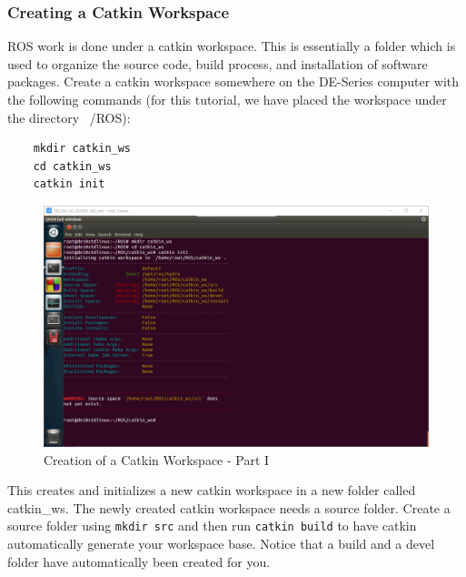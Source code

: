 \documentclass[11pt, twoside, pdftex]{article}
\begin{document}
\subsubsection{Creating a Catkin Workspace}
ROS work is done under a catkin workspace. This is essentially a folder which is used to organize the source code, build process, and installation of software packages. Create a catkin workspace somewhere on the DE-Series computer with the following commands (for this tutorial, we have placed the workspace under the directory ~/ROS):
\begin{lstlisting}
	mkdir catkin_ws
	cd catkin_ws
	catkin init
\end{lstlisting}
\begin{figure}[H]
	\begin{center}
		\includegraphics[scale=0.55]{figures/create_catkin_ws.png}
		\caption{Creation of a Catkin Workspace - Part I}
		\label{fig:createcatkinws}
	\end{center}
\end{figure}
\newpage
This creates and initializes a new catkin workspace in a new folder called {\sf catkin\_ws}. The newly created catkin workspace needs a source folder. Create a source folder using \lstinline|mkdir src| and then run \lstinline|catkin build| to have catkin automatically generate your workspace base. Notice that a build and a devel folder have automatically been created for you.
\end{document}
